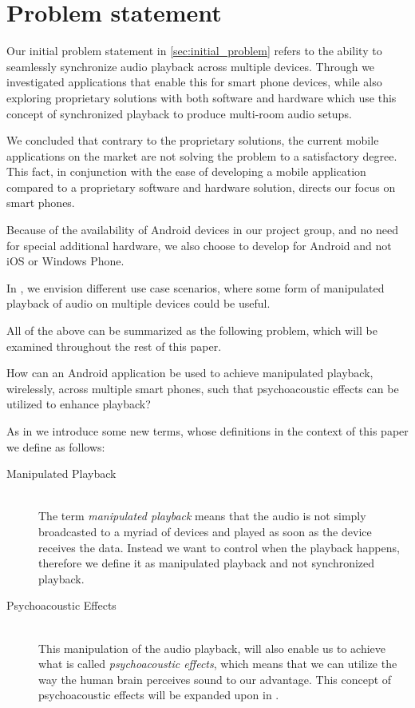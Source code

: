 \chapter{Problem statement}\label{cha:problem_statement}
Our initial problem statement in \cref{sec:initial_problem} refers to the ability to seamlessly synchronize audio playback across multiple devices.
Through  we investigated applications that enable this for smart phone devices, while also exploring proprietary solutions with both software and hardware which use this concept of synchronized playback to produce multi-room audio setups.

We concluded that contrary to the proprietary solutions, the current mobile applications on the market are not solving the problem to a satisfactory degree.
This fact, in conjunction with the ease of developing a mobile application compared to a proprietary software and hardware solution, directs our focus on smart phones.

Because of the availability of Android devices in our project group, and no need for special additional hardware, we also choose to develop for Android and not iOS or Windows Phone.

In , we envision different use case scenarios, where some form of manipulated playback of audio on multiple devices could be useful.

\bigskip
All of the above can be summarized as the following problem, which will be examined throughout the rest of this paper.

\begin{problemstatement}
    How can an Android application be used to achieve manipulated playback, wirelessly, across multiple smart phones, such that psychoacoustic effects can be utilized to enhance playback?
\end{problemstatement}

\bigskip\noindent
As in  we introduce some new terms, whose definitions in the context of this paper we define as follows:

\begin{description}
    \item[Manipulated Playback] \hfill \\
        The term \textit{manipulated playback} means that the audio is not simply broadcasted to a myriad of devices and played as soon as the device receives the data.
        Instead we want to control when the playback happens, therefore we define it as manipulated playback and not synchronized playback.
    \item[Psychoacoustic Effects] \hfill \\
        This manipulation of the audio playback, will also enable us to achieve what is called \textit{psychoacoustic effects}, which means that we can utilize the way the human brain perceives sound to our advantage.
        This concept of psychoacoustic effects will be expanded upon in .
\end{description}
